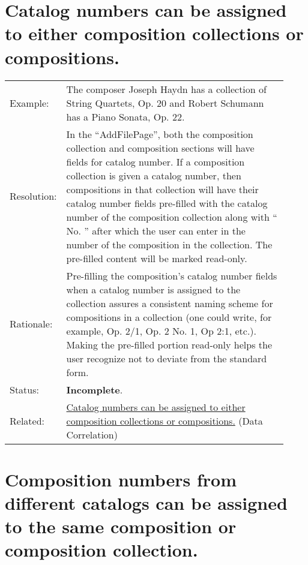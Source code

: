\documentclass[letterpaper]{report}
\begin{document}
\section{Catalog numbers can be assigned to either composition collections or compositions.}
\label{UI.1}

\begin{tabular}{ p{0.1\linewidth} p{0.825\linewidth} }
  Example: & The composer Joseph Haydn has a collection of String Quartets, Op. 20 and Robert Schumann has a Piano Sonata, Op. 22. \\ 
  Resolution: & In the ``AddFilePage'', both the composition collection and composition sections will have fields for catalog number. If a composition collection is given a catalog number, then compositions in that collection will have their catalog number fields pre-filled with the catalog number of the composition collection along with `` No. '' after which the user can enter in the number of the composition in the collection. The pre-filled content will be marked read-only. \\ 
  Rationale: & Pre-filling the composition's catalog number fields when a catalog number is assigned to the collection assures a consistent naming scheme for compositions in a collection (one could write, for example, Op. 2/1, Op. 2 No. 1, Op 2:1, etc.). Making the pre-filled portion read-only helps the user recognize not to deviate from the standard form. \\
  Status: & \textbf{Incomplete}. \\
  Related: & \hyperref[D.1]{Catalog numbers can be assigned to either composition collections or compositions.} (Data Correlation)
\end{tabular}

\section{Composition numbers from different catalogs can be assigned to the same composition or composition collection.}
\label{UI.2}
\end{document}
